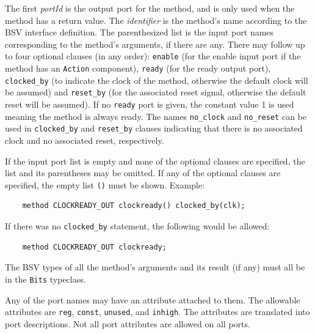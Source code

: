 \documentclass[twoside,letterpaper]{article}
\newcommand{\te}[1]{\texttt{#1}}
\newcommand{\nterm}[1]{\emph{#1}}
\newcommand{\term}[1]{\texttt{#1}}
\begin{document}
The first \nterm{portId} is the output port for the method, and is
only used when the method has  a return value. The  \nterm{identifier} is the method's name according to the BSV interface
definition. The parenthesized list is the input port names corresponding to
the method's arguments, if there are any. There may follow up to four optional clauses (in
any order): \texttt{enable} (for the enable input port if the method
has an \te{Action} component), \texttt{ready} (for the ready output
port), \texttt{clocked\_by} (to indicate the clock of the method, 
otherwise the default clock will be assumed) and \texttt{reset\_by}
(for the associated reset signal, otherwise the default reset will be
assumed).  If no \term{ready} port is given, the constant value 1 is
used meaning the method is always ready.  The names \te{no\_clock} and
 \te{no\_reset} can be used in \te{clocked\_by} and \te{reset\_by}
clauses indicating that there is no
associated clock and no associated reset, respectively.
 
  If the
input port  list is empty and none of the optional clauses are
specified, the list and its parentheses may  be
omitted.  If any of the optional clauses are specified, the empty list 
\texttt{()} must be shown.  Example:
\begin{verbatim}
    method CLOCKREADY_OUT clockready() clocked_by(clk);
\end{verbatim}
If there was no \te{clocked\_by} statement, the following would be
allowed:
\begin{verbatim}
    method CLOCKREADY_OUT clockready;
\end{verbatim}

The BSV types of all the method's arguments and its result (if any) must all be
in the \texttt{Bits} typeclass.

      
   



Any of the port names may have an attribute attached to them. The
allowable attributes are  \texttt{reg}, \texttt{const},
\texttt{unused}, and \texttt{inhigh}.  The attributes are translated
into port descriptions.  Not all port attributes are allowed on 
all ports.  
\end{document}
